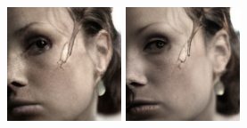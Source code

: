 \begin{figure}[h]
\begin{minipage}{0.15\textwidth}
    \end{minipage}
    \begin{minipage}{0.15\textwidth}
        \centering
        \includegraphics[width=\linewidth]{material/1k/328.png}
    \end{minipage}
    \begin{minipage}{0.15\textwidth}
        \centering
        \includegraphics[width=\linewidth]{material/8k/328.png}

\end{minipage}
\end{figure}
